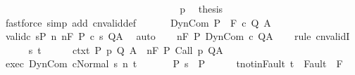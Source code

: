 \begin{isabellebody}
\isanewline
\ \ \ \ \ \ \ \ \ \ \isamarkupfalse%
\isanewline
\ \ \ \ \ \ \ \ \isamarkupfalse%
\isanewline
\ \ \ \ \ \ \isamarkupfalse%
\isanewline
\ \ \ \ \isacommand{{\isacharbraceright}}\isamarkupfalse%
\isanewline
\ \ \ \ \isamarkupfalse%
\ p\ \isamarkupfalse%
\ {\isacharquery}thesis\isanewline
\ \ \ \ \ \ \isamarkupfalse%
\ {\isacharparenleft}fastforce\ simp\ add{\isacharcolon}\ cnvalid{\isacharunderscore}def{\isacharparenright}\isanewline
\ \ \isamarkupfalse%
\isanewline
{}\isamarkupfalse%
\isanewline
\ \ \isamarkupfalse%
\ {\isacharparenleft}DynCom\ P\ {\isasymTheta}\ F\ c\ Q\ A{\isacharparenright}\isanewline
\ \ \isamarkupfalse%
\ valid{\isacharunderscore}c{\isacharcolon}\ {\isachardoublequoteopen}{\isasymforall}s{\isasymin}P{\isachardot}\ {\isacharparenleft}{\isasymforall}n{\isachardot}\ {\isasymGamma}{\isacharcomma}{\isasymTheta}{\isasymTurnstile}n{\isacharcolon}\isactrlbsub {\isacharslash}F\isactrlesub \ P\ {\isacharparenleft}c\ s{\isacharparenright}\ Q{\isacharcomma}A{\isacharparenright}{\isachardoublequoteclose}\ \isamarkupfalse%
\ auto\isanewline
\ \ \isamarkupfalse%
\ {\isachardoublequoteopen}{\isasymGamma}{\isacharcomma}{\isasymTheta}{\isasymTurnstile}n{\isacharcolon}\isactrlbsub {\isacharslash}F\isactrlesub \ P\ DynCom\ c\ Q{\isacharcomma}A{\isachardoublequoteclose}\isanewline
\ \ \isamarkupfalse%
\ {\isacharparenleft}rule\ cnvalidI{\isacharparenright}\isanewline
\ \ \ \ \isamarkupfalse%
\ s\ t\isanewline
\ \ \ \ \isamarkupfalse%
\ ctxt{\isacharcolon}\ {\isachardoublequoteopen}{\isasymforall}{\isacharparenleft}P{\isacharcomma}\ p{\isacharcomma}\ Q{\isacharcomma}\ A{\isacharparenright}{\isasymin}{\isasymTheta}{\isachardot}\ {\isasymGamma}\ {\isasymTurnstile}n{\isacharcolon}\isactrlbsub {\isacharslash}F\isactrlesub \ P\ {\isacharparenleft}Call\ p{\isacharparenright}\ Q{\isacharcomma}A{\isachardoublequoteclose}\isanewline
\ \ \ \ \isamarkupfalse%
\ exec{\isacharcolon}\ {\isachardoublequoteopen}{\isasymGamma}{\isasymturnstile}{\isasymlangle}DynCom\ c{\isacharcomma}Normal\ s{\isasymrangle}\ {\isacharequal}n{\isasymRightarrow}\ t{\isachardoublequoteclose}\ \isanewline
\ \ \ \ \isamarkupfalse%
\ P{\isacharcolon}\ {\isachardoublequoteopen}s\ {\isasymin}\ P{\isachardoublequoteclose}\isanewline
\ \ \ \ \isamarkupfalse%
\ t{\isacharunderscore}notin{\isacharunderscore}Fault{\isacharcolon}\ {\isachardoublequoteopen}t\ {\isasymnotin}\ Fault\ {\isacharbackquote}\ F{\isachardoublequoteclose}\isanewline

\end{isabellebody}

